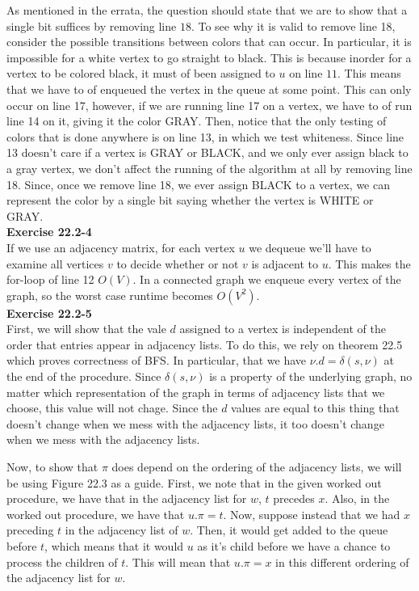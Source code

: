 \documentclass{article}
\begin{document}
As mentioned in the errata, the question should state that we are to show that a single bit suffices by removing line $18$. To see why it is valid to remove line 18, consider the possible transitions between colors that can occur. In particular, it is impossible for a white vertex to go straight to black. This is because inorder for a vertex to be colored black, it must of been assigned to $u$ on line $11$. This means that we have to of enqueued the vertex in the queue at some point. This can only occur on line 17, however, if we are running line 17 on a vertex, we have to of run line 14 on it, giving it the color GRAY. Then, notice that the only testing of colors that is done anywhere is on line 13, in which we test whiteness. Since line 13 doesn't care if a vertex is GRAY or BLACK, and we only ever assign black to a gray vertex, we don't affect the running of the algorithm at all by removing line 18. Since, once we remove line 18, we ever assign BLACK to a vertex, we can represent the color by a single bit saying whether the vertex is WHITE or GRAY.\\

\noindent\textbf{Exercise 22.2-4}\\

If we use an adjacency matrix, for each vertex $u$ we dequeue we'll have to examine all vertices $v$ to decide whether or not $v$ is adjacent to $u$.  This makes the for-loop of line 12 $O(V)$.  In a connected graph we enqueue every vertex of the graph, so the worst case runtime becomes $O(V^2)$. \\

\noindent\textbf{Exercise 22.2-5}\\

First, we will show that the vale $d$ assigned to a vertex is independent of the order that entries appear in adjacency lists. To do this, we rely on theorem 22.5 which proves correctness of BFS. In particular, that we have $\nu.d = \delta(s,\nu)$ at the end of the procedure. Since $\delta(s,\nu)$ is a property of the underlying graph, no matter which representation of the graph in terms of adjacency lists that we choose, this value will not chage. Since the $d$ values are equal to this thing that doesn't change when we mess with the adjacency lists, it too doesn't change when we mess with the adjacency lists.

Now, to show that $\pi$ does depend on the ordering of the adjacency lists, we will be using Figure 22.3 as a guide. First, we note that in the given worked out procedure, we have that in the adjacency list for $w$, $t$ precedes $x$. Also, in the worked out procedure, we have that $u.\pi = t$. Now, suppose instead that we had $x$ preceding $t$ in the adjacency list of $w$. Then, it would get added to the queue before $t$, which means that it would $u$ as it's child before we have a chance to process the children of $t$. This will mean that $u.\pi = x$ in this different ordering of the adjacency list for $w$.\\
\end{document}

